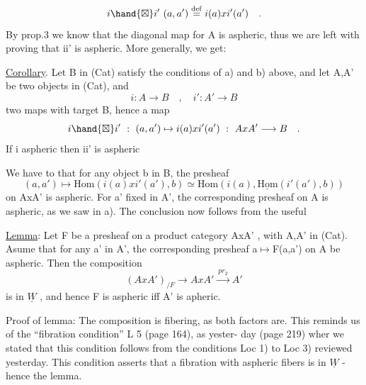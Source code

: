 \[ i\hand{\boxtimes}i'\ (a,a') \overset{\mathrm{def}}{=} i(a)xi'(a') \quad . \]
By prop.3 we know  that the diagonal map  for A is aspheric,  thus we
are left with proving that i\hand{\boxtimes}i' is aspheric.  More generally,  we get:

\uline{Corollary}. Let B in (Cat)  satisfy the conditions of a) and b) above,
and let  A,A' be two objects in (Cat),  and
\[ i\colon A \longrightarrow B \quad , \quad i'\colon A'\longrightarrow B \]
two maps with target B,  hence a map
\[ i\hand{\boxtimes}i' \ : \ (a,a')\mapsto i(a)xi'(a') \ : \ AxA' \longrightarrow B \quad . \]
If  i  aspheric\hand{,}  then i\hand{\boxtimes}i' is
aspheric\hand{,}  

We have to   that for any object b in B,  the presheaf
 \[ (a,a')\mapsto \mathrm{Hom}(i(a)xi'(a'),b) \simeq \mathrm{Hom}(i(a), \underline{\mathrm{Hom}}(i'(a'),b)) \]
on AxA' is aspheric.  For a' fixed in A',  the corresponding presheaf
on A is aspheric,  as we saw in a).  The conclusion now follows from the
useful

\uline{Lemma}:  Let F be a presheaf on a product category AxA' ,  with A,A' in
(Cat).  Asume that for any a' in A',  the corresponding presheaf
a$\mapsto$F(a,a') on A be aspheric.  Then the composition
\[ (AxA')_{/F} \longrightarrow AxA' \xrightarrow{\ pr_2\ } A' \]
is in $\underline{W}$ ,  and hence F is aspheric iff A' is apheric.

Proof of lemma:  The composition is fibering, as both factors are.
This reminds us of the ``fibration condition'' L 5 (page 164),  as yester-%
day  (page 219)\hand{,} wher we stated that this condition follows from the
conditions Loc 1)  to Loc 3)  reviewed yesterday.  This condition asserts
that a fibration with aspheric fibers is in $\underline{W}$  -  hence the lemma.

